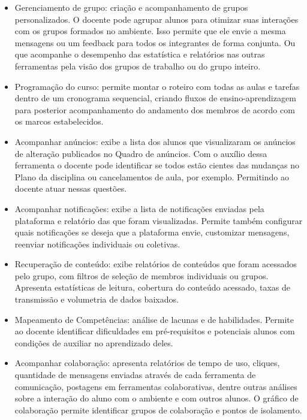 \begin{itemize}

\item Gerenciamento de grupo: criação e acompanhamento de grupos personalizados. O docente pode agrupar alunos para otimizar suas interações com os grupos formados no ambiente. Isso permite que ele envie a mesma mensagens ou um feedback para todos os integrantes de forma conjunta. Ou que acompanhe o desempenho das estatística e relatórios nas outras ferramentas pela visão dos grupos de trabalho ou do grupo inteiro. 

\item Programação do curso: permite montar o roteiro com todas as aulas e tarefas dentro de um cronograma sequencial, criando fluxos de ensino-aprendizagem para posterior acompanhamento do andamento dos membros de acordo com os marcos estabelecidos.

\item Acompanhar anúncios: exibe a lista dos alunos que visualizaram os anúncios de alteração publicados no Quadro de anúncios. Com o auxílio dessa ferramenta o docente pode identificar se todos estão cientes das mudanças no Plano da disciplina ou cancelamentos de aula, por exemplo. Permitindo ao docente atuar nessas questões. 

\item Acompanhar notificações: exibe a lista de notificações enviadas pela plataforma e relatório das que foram visualizadas. Permite também configurar quais notificações se deseja que a plataforma envie, customizar mensagens, reenviar notificações individuais ou coletivas.

\item Recuperação de conteúdo: exibe relatórios de conteúdos que foram acessados pelo grupo, com filtros de seleção de membros individuais ou grupos. Apresenta estatísticas de leitura, cobertura do conteúdo acessado, taxas de transmissão e volumetria de dados baixados. 

\item Mapeamento de Competências: análise de lacunas e de habilidades. Permite ao docente identificar dificuldades em pré-requisitos e potenciais alunos com condições de auxiliar no aprendizado deles.

\item Acompanhar colaboração: apresenta relatórios de tempo de uso, cliques, quantidade de mensagens enviadas através de cada ferramenta de comunicação, postagens em ferramentas colaborativas, dentre outras análises sobre a interação do aluno com o ambiente e com outros alunos. O gráfico de colaboração permite identificar grupos de colaboração e pontos de isolamento.


\end{itemize}
